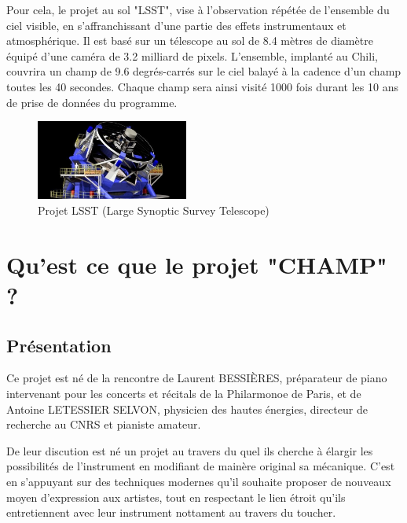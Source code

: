 \documentclass[french,a4paper,12pt]{report}
\begin{document}
\begin{itemize}
  Pour cela, le projet au sol "LSST", vise à l'observation répétée de l'ensemble du ciel visible, en s'affranchissant d'une partie des effets instrumentaux et atmosphérique. Il est basé sur un télescope au sol de 8.4 mètres de diamètre équipé d'une caméra de 3.2 milliard de pixels. L'ensemble, implanté au Chili, couvrira un champ de 9.6 degrés-carrés sur le ciel balayé à la cadence d'un champ toutes les 40 secondes. Chaque champ sera ainsi visité 1000 fois durant les 10 ans de prise de données du programme.\newline
    	
	\begin{figure}[!ht]
    \center
    \includegraphics[width=5cm]{lsst.jpg}
    \caption{Projet LSST (Large Synoptic Survey Telescope)}
		\end{figure} 
  	
  \end{itemize}
  
    
%
%
\part{Qu'est ce que le projet "CHAMP" ?}
  \chapter{Présentation}
  
  Ce projet est né de la rencontre de Laurent BESSIÈRES, préparateur de piano intervenant pour les concerts et récitals de la Philarmonoe de Paris, et de Antoine LETESSIER SELVON, physicien des hautes énergies, directeur de recherche au CNRS et pianiste amateur. 
  
  De leur discution est né un projet au travers du quel ils cherche à élargir les possibilités de l'instrument en modifiant de mainère original sa mécanique. C'est en s'appuyant sur des techniques modernes qu'il souhaite proposer de nouveaux moyen d'expression aux artistes, tout en respectant le lien étroit qu'ils entretiennent avec leur instrument nottament au travers du toucher.
  
\end{document}
